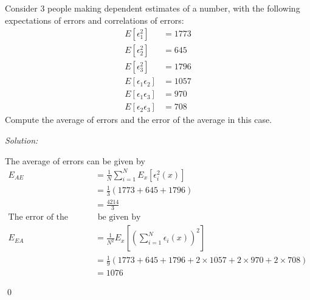 \documentclass[12pt]{article}
\newenvironment{problem}[2][Problem]{\begin{trivlist}
\item[\hskip \labelsep {\bfseries #1}\hskip \labelsep {\bfseries #2.}]}{\end{trivlist}}
\newenvironment{sol}
    {\emph{Solution:}
    }
    {
    \qed
    }
\begin{document}
\begin{problem}{3}
	Consider 3 people making dependent estimates of a number, with the following expectations of errors and correlations of errors:
	\begin{align*}
		E[\epsilon_1^2] &= 1773 \\
		E[\epsilon_2^2] &= 645 \\
		E[\epsilon_3^2] &= 1796 \\
		E[\epsilon_1\epsilon_2] &= 1057 \\
		E[\epsilon_1\epsilon_3] &= 970 \\
		E[\epsilon_2\epsilon_3] &= 708
	\end{align*}
	Compute the average of errors and the error of the average in this case.
\end{problem}
\begin{sol}
	The average of errors can be given by
	\begin{align*}
		E_{AE} &= \frac{1}{N} \sum_{i=1}^{N} E_x[\epsilon_i^2(x)] \\
			   &= \frac{1}{3} (1773+645+1796) \\
			   &= \frac{4214}{3}\\
	\text{The error of the average can} &\text{ be given by}\\
		E_{EA} &= \frac{1}{N^2} E_x[(\sum_{i=1}^{N}\epsilon_i(x))^2] \\
			   &= \frac{1}{9}(1773+645+1796+2\times 1057+2\times 970 + 2\times 708) \\
			   &= 1076
	\end{align*}
\end{sol}
\end{document}
